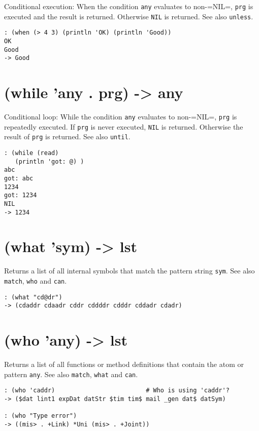{{{{{{{{Conditional execution: When the condition \texttt{any} evaluates to non-=NIL=,
\texttt{prg} is executed and the result is returned. Otherwise \texttt{NIL} is
returned. See also \texttt{unless}.


\begin{verbatim}
: (when (> 4 3) (println 'OK) (println 'Good))
OK
Good
-> Good
\end{verbatim}

 
\section{(while 'any . prg) -> any}
\label{sec-8-1-23-4}


Conditional loop: While the condition \texttt{any} evaluates to non-=NIL=,
\texttt{prg} is repeatedly executed. If \texttt{prg} is never executed, \texttt{NIL} is
returned. Otherwise the result of \texttt{prg} is returned. See also \texttt{until}.


\begin{verbatim}
: (while (read)
   (println 'got: @) )
abc
got: abc
1234
got: 1234
NIL
-> 1234
\end{verbatim}

 
\section{(what 'sym) -> lst}
\label{sec-8-1-23-5}


Returns a list of all internal symbols that match the pattern string
\texttt{sym}. See also \texttt{match}, \texttt{who} and \texttt{can}.


\begin{verbatim}
: (what "cd@dr")
-> (cdaddr cdaadr cddr cddddr cdddr cddadr cdadr)
\end{verbatim}

 
\section{(who 'any) -> lst}
\label{sec-8-1-23-6}


Returns a list of all functions or method definitions that contain the
atom or pattern \texttt{any}. See also \texttt{match}, \texttt{what} and \texttt{can}.


\begin{verbatim}
: (who 'caddr)                         # Who is using 'caddr'?
-> ($dat lint1 expDat datStr $tim tim$ mail _gen dat$ datSym)

: (who "Type error")
-> ((mis> . +Link) *Uni (mis> . +Joint))


\end{verbatim}}}}}}}}}
